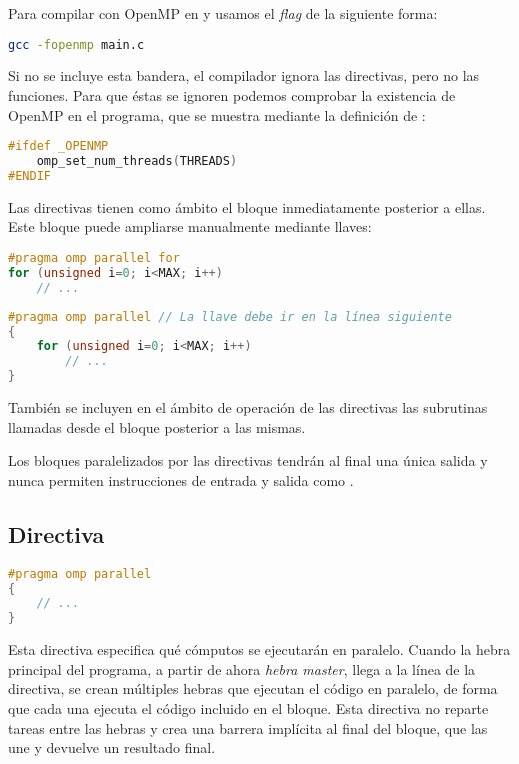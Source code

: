 Para compilar con OpenMP en  y  usamos el \textit{flag}  de la siguiente forma:

\begin{lstlisting}[language=sh]
gcc -fopenmp main.c
\end{lstlisting}

Si no se incluye esta bandera, el compilador ignora las directivas, pero no las funciones.
Para que éstas se ignoren podemos comprobar la existencia de OpenMP en el programa, que se muestra mediante la definición de :

\begin{lstlisting}[language=C]
#ifdef _OPENMP
	omp_set_num_threads(THREADS)
#ENDIF
\end{lstlisting}

Las directivas tienen como ámbito el bloque inmediatamente posterior a ellas.
Este bloque puede ampliarse manualmente mediante llaves:

\begin{lstlisting}[language=C]
#pragma omp parallel for
for (unsigned i=0; i<MAX; i++)
	// ...
\end{lstlisting}

\begin{lstlisting}[language=C]
#pragma omp parallel // La llave debe ir en la línea siguiente
{
	for (unsigned i=0; i<MAX; i++)
		// ...
}
\end{lstlisting}

También se incluyen en el ámbito de operación de las directivas las subrutinas llamadas desde el bloque posterior a las mismas.

Los bloques paralelizados por las directivas tendrán al final una única salida y nunca permiten instrucciones de entrada y salida como .

\subsection{Directiva }\label{directivas-openmp-directivas-parallel}

\begin{lstlisting}[language=C]
#pragma omp parallel
{
	// ...
}
\end{lstlisting}

Esta directiva especifica qué cómputos se ejecutarán en paralelo.
Cuando la hebra principal del programa, a partir de ahora \textit{hebra master}, llega a la línea de la directiva, se crean múltiples hebras que ejecutan el código en paralelo, de forma que cada una ejecuta el código incluido en el bloque.
Esta directiva no reparte tareas entre las hebras y crea una barrera implícita al final del bloque, que las une y devuelve un resultado final.

